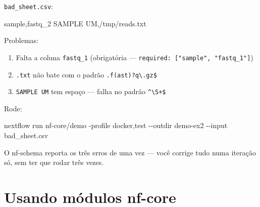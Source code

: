 \documentclass[
  brazilian,
  letterpaper,
  DIV=11,
  numbers=noendperiod]{scrreprt}
\newenvironment{Shaded}{\begin{snugshade}}{\end{snugshade}}
\newcommand{\AttributeTok}[1]{\textcolor[rgb]{0.40,0.45,0.13}{#1}}
\newcommand{\ExtensionTok}[1]{\textcolor[rgb]{0.00,0.23,0.31}{#1}}
\newcommand{\NormalTok}[1]{\textcolor[rgb]{0.00,0.23,0.31}{#1}}
\providecommand{\tightlist}{%
  \setlength{\itemsep}{0pt}\setlength{\parskip}{0pt}}
\begin{document}
\begin{tcolorbox}[enhanced jigsaw, arc=.35mm, bottomrule=.15mm, bottomtitle=1mm, breakable, colback=white, colbacktitle=quarto-callout-tip-color!10!white, colframe=quarto-callout-tip-color-frame, coltitle=black, left=2mm, leftrule=.75mm, opacityback=0, opacitybacktitle=0.6, rightrule=.15mm, title=\textcolor{quarto-callout-tip-color}{\faLightbulb}\hspace{0.5em}{Resposta}, titlerule=0mm, toprule=.15mm, toptitle=1mm]

\texttt{bad\_sheet.csv}:

\begin{Shaded}
\begin{Highlighting}[]
\NormalTok{sample,fastq\_2}
\NormalTok{SAMPLE UM,/tmp/reads.txt}
\end{Highlighting}
\end{Shaded}

Problemas:

\begin{enumerate}
\def\labelenumi{\arabic{enumi}.}
\tightlist
\item
  Falta a coluna \texttt{fastq\_1} (obrigatória ---
  \texttt{required:\ {[}"sample",\ "fastq\_1"{]}})
\item
  \texttt{.txt} não bate com o padrão
  \texttt{.f(ast)?q\textbackslash{}.gz\$}
\item
  \texttt{SAMPLE\ UM} tem espaço --- falha no padrão
  \texttt{\^{}\textbackslash{}S+\$}
\end{enumerate}

Rode:

\begin{Shaded}
\begin{Highlighting}[]
\ExtensionTok{nextflow}\NormalTok{ run nf{-}core/demo }\AttributeTok{{-}profile}\NormalTok{ docker,test }\AttributeTok{{-}{-}outdir}\NormalTok{ demo{-}ex2 }\AttributeTok{{-}{-}input}\NormalTok{ bad\_sheet.csv}
\end{Highlighting}
\end{Shaded}

O nf-schema reporta os três erros de uma vez --- você corrige tudo numa
iteração só, sem ter que rodar três vezes.

\end{tcolorbox}

\chapter{Usando módulos nf-core}\label{usando-muxf3dulos-nf-core}
\end{document}
